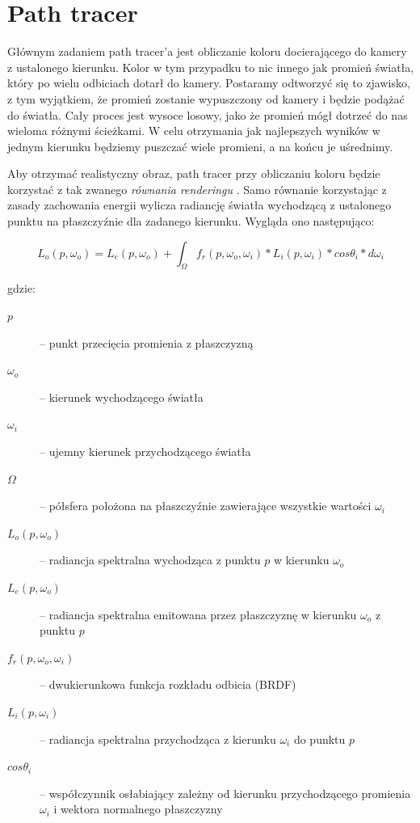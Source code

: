 \documentclass[inz,shortabstract]{iithesis}
\begin{document}
    \section{Path tracer}
        Głównym zadaniem path tracer'a jest obliczanie koloru docierającego do kamery z ustalonego kierunku. Kolor w tym przypadku to nic innego jak promień światła, który po wielu odbiciach dotarł do kamery. Postaramy odtworzyć się to zjawisko, z tym wyjątkiem, że promień zostanie wypuszczony od kamery i będzie podążać do światła. Cały proces jest wysoce losowy, jako że promień mógł dotrzeć do nas wieloma różnymi ścieżkami. W celu otrzymania jak najlepszych wyników w jednym kierunku będziemy puszczać wiele promieni, a na końcu je uśrednimy.
        
        Aby otrzymać realistyczny obraz, path tracer przy obliczaniu koloru będzie korzystać z tak zwanego \textit{równania renderingu} \cite{pbrt}. Samo równanie korzystając z zasady zachowania energii wylicza radiancję światła wychodzącą z ustalonego punktu na płaszczyźnie dla zadanego kierunku. Wygląda ono następująco:
        
        \begin{equation*}
            L_o(p, \omega_o) = L_e(p, \omega_o) + \int_{\Omega} f_r(p, \omega_o, \omega_i) * L_i(p, \omega_i)*cos\theta_i*d\omega_i
        \end{equation*}
        
        gdzie:
        
        \begin{description}
            \item[$p$] -- punkt przecięcia promienia z płaszczyzną
            \item[$\omega_o$] -- kierunek wychodzącego światła
            \item[$\omega_i$] -- ujemny kierunek przychodzącego światła
            \item[$\Omega$] -- półsfera położona na płaszczyźnie zawierające wszystkie wartości $\omega_i$ 
            \item[$L_o(p, \omega_o)$] -- radiancja spektralna wychodząca z punktu $p$ w kierunku $\omega_o$
            \item[$L_e(p, \omega_o)$] -- radiancja spektralna emitowana przez płaszczyznę w kierunku $\omega_o$ z punktu $p$  
            \item[$f_r(p, \omega_o, \omega_i)$] -- dwukierunkowa funkcja rozkładu odbicia (BRDF)
            \item[$L_i(p, \omega_i)$] -- radiancja spektralna przychodząca z kierunku $\omega_i$ do punktu $p$
            \item[$cos\theta_i$] -- współczynnik osłabiający zależny od kierunku przychodzącego promienia $\omega_i$ i wektora normalnego płaszczyzny
        \end{description}
\end{document}
